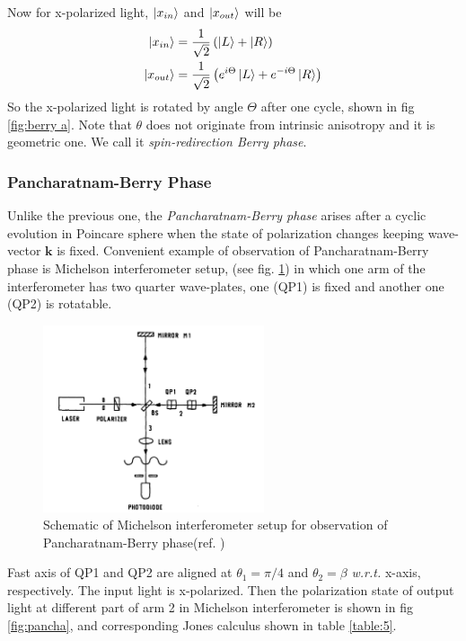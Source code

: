 \documentclass[11pt,a4paper]{article}
\numberwithin{equation}{section}
\begin{document}
Now for x-polarized light, $\ket{x_{in}}$ and $\ket{x_{out}}$ will be
\begin{align}
	\ket{x_{in}} &= \frac{1}{\sqrt{2}}\left(\ket{L}+\ket{R}\right)\\
	\ket{x_{out}} &= \frac{1}{\sqrt{2}}\left(e^{i\Theta}\ket{L}+ e^{-i\Theta}\ket{R}\right)
\end{align} So the x-polarized light is rotated by angle $\Theta$ after one cycle, shown in fig \ref{fig:berry a}. Note that $\theta$ does not originate from intrinsic anisotropy and it is geometric one. We call it \textit{spin-redirection Berry phase}.

\subsubsection{Pancharatnam-Berry Phase}
Unlike the previous one, the \textit{Pancharatnam-Berry phase} arises after a cyclic evolution in Poincare sphere when the state of polarization changes  keeping wave-vector $\boldsymbol{k}$ is fixed. Convenient example of observation of Pancharatnam-Berry phase is Michelson interferometer setup, (see fig. \ref{fig:pb expt}) in which one arm of the interferometer has two quarter wave-plates, one (QP1) is fixed and another one (QP2) is rotatable. \cite{chyba 88}

\begin{figure}[H]
	\centering
	\includegraphics[width=6.5cm]{pb expt.png}
	\caption{Schematic of Michelson interferometer setup for observation of Pancharatnam-Berry phase(ref. \cite{chyba 88})}
	\label{fig:pb expt}
\end{figure}

 Fast axis of QP1 and QP2 are aligned at $\theta_1= \pi/4$ and $\theta_2= \beta$ \textit{w.r.t.} x-axis, respectively. The input light is x-polarized. Then the polarization state of output light at different part of arm 2 in Michelson interferometer is shown in fig \ref{fig:pancha}, and corresponding Jones calculus shown in table \ref{table:5}.
 
\end{document}
